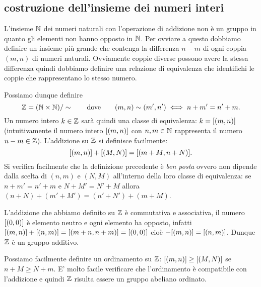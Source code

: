 \subsection{costruzione dell'insieme dei numeri interi}

L'insieme ${\mathbb N}$ dei numeri naturali con l'operazione di addizione 
non è un gruppo in quanto gli elementi non hanno opposto in ${\mathbb N}$.
Per ovviare a questo dobbiamo definire un insieme più grande che 
contenga la differenza $n-m$ di ogni coppia $(m,n)$ di numeri naturali.
Ovviamente coppie diverse possono avere la stessa differenza quindi 
dobbiamo definire una relazione di equivalenza che identifichi le coppie 
che rappresentano lo stesso numero. 

Possiamo dunque definire 
\[
  {\mathbb Z} = ({\mathbb N} \times {\mathbb N})/\sim
  \qquad\text{dove}\qquad
  (m,n)\sim (m',n')\iff n+m' = n'+m.
\]
Un numero intero $k\in {\mathbb Z}$ sarà quindi una classe di equivalenza:
$k = {\left[ (m,n) \right]}$ (intuitivamente il numero intero ${\left[ (m,n) \right]}$ 
con $n,m\in {\mathbb N}$ 
rappresenta il numero $n-m\in {\mathbb Z}$).
L'addizione su ${\mathbb Z}$ si definisce facilmente:
\[
 {\left[ (m,n) \right]}+{\left[ (M,N) \right]} = {\left[ (m+M,n+N) \right]}.
\]
Si verifica facilmente che la definizione precedente è \emph{ben posta}
ovvero non dipende dalla scelta di $(n,m)$ e $(N,M)$ all'interno 
della loro classe di equivalenza: se $n+m' = n'+m$ e $N+M'=N'+M$ 
allora $(n+N)+(m'+M')=(n'+N')+(m+M)$.

L'addizione che abbiamo definito su ${\mathbb Z}$ è commutativa e associativa, 
il numero ${\left[ (0,0) \right]}$
è elemento neutro e ogni elemento ha opposto, infatti 
${\left[ (m,n) \right]} + {\left[ (n,m) \right]} = {\left[ (m+n,n+m) \right]}={\left[ (0,0) \right]}$
cioè $-{\left[ (m,n) \right]}={\left[ (n,m) \right]}$.
Dunque ${\mathbb Z}$ è un gruppo additivo.

Possiamo facilmente definire un ordinamento su ${\mathbb Z}$:
${\left[ (m,n) \right]} \ge {\left[ (M,N) \right]}$ se 
$n+M\ge N+m$.
E' molto facile verificare che l'ordinamento è compatibile 
con l'addizione e quindi ${\mathbb Z}$ risulta essere un gruppo abeliano ordinato.

